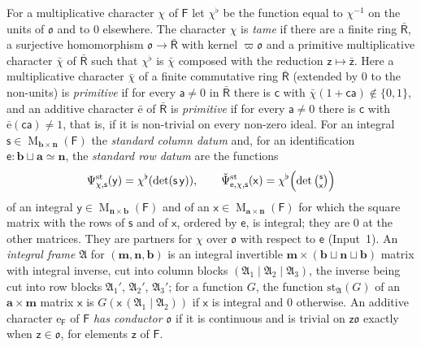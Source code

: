 \documentclass[11pt,a4paper]{article}
\newcommand{\kw}[1]{\emph{#1}}
\theoremstyle{plainx}
\theoremstyle{uprightx}
\newcommand{\dL}{\check{\Psi}}         %
\newcommand{\dS}{\Psi}                 %
\newcommand{\sF}{\mathsf{F}}
\newcommand{\sO}{\mathfrak{o}}
\newcommand{\sR}{\mathsf{R}}
\newcommand{\ba}{\mathbf{a}}
\newcommand{\bb}{\mathbf{b}}
\newcommand{\bm}{\mathbf{m}}
\newcommand{\bn}{\mathbf{n}}
\newcommand{\se}{\mathsf{e}}
\newcommand{\sx}{\mathsf{x}}
\newcommand{\sy}{\mathsf{y}}
\newcommand{\sz}{\mathsf{z}}
\newcommand{\ssx}{\mathsf{s}}
\newcommand{\fA}{\mathfrak{A}}
\newcommand{\Mat}[2]{\operatorname{M}_{#1\times#2}}
\newcommand{\stc}[2]{\dS^{\mathrm{st}}_{#1,#2}}
\newcommand{\str}[3]{\dL^{\mathrm{st}}_{#1,#2,#3}}
\newcommand{\inu}[1]{#1^{\flat}}
\begin{document}
For a multiplicative character $\chi$ of $\sF$ let $\inu{\chi}$ be the function equal to $\chi^{-1}$ on the units
of $\sO$ and to $0$ elsewhere. The character $\chi$ is \kw{tame} if there are a finite ring $\bar{\sR}$, a
surjective homomorphism $\sO\to\bar{\sR}$ with kernel $\varpi\sO$ and a primitive multiplicative character $\bar\chi$
of $\bar{\sR}$ such that $\inu{\chi}$ is $\bar\chi$ composed with the reduction $\sz\mapsto\bar{\sz}$. Here a
multiplicative character $\bar\chi$ of a finite commutative ring $\bar{\sR}$ (extended by $0$ to the non-units) is
\kw{primitive} if for every $\mathsf{a}\ne0$ in $\bar{\sR}$ there is $\mathsf{c}$ with
$\bar\chi(1+\mathsf{c}\mathsf{a})\notin\{0,1\}$, and an additive character $\bar{\mathrm{e}}$ of $\bar{\sR}$ is
\kw{primitive} if for every $\mathsf{a}\ne0$ there is $\mathsf{c}$ with $\bar{\mathrm{e}}(\mathsf{c}\mathsf{a})\ne1$,
that is, if it is non-trivial on every non-zero ideal. For an integral
$\ssx\in\Mat{\bb}{\bn}(\sF)$ the \kw{standard column datum} and, for an identification
$\se\colon\bb\sqcup\ba\simeq\bn$, the \kw{standard row datum} are the functions
\[\stc{\chi}{\ssx}(\sy)=\inu{\chi}(\det(\ssx\,\sy)),\qquad
\str{\se}{\chi}{\ssx}(\sx)=\inu{\chi}\Bigl(\det\tbinom{\ssx}{\sx}\Bigr)\]
of an integral $\sy\in\Mat{\bn}{\bb}(\sF)$ and of an $\sx\in\Mat{\ba}{\bn}(\sF)$ for which the square matrix with
the rows of $\ssx$ and of $\sx$, ordered by $\se$, is integral; they are $0$ at the other matrices. They are
partners for $\chi$ over $\sO$ with respect to $\se$ (Input~1). An \kw{integral frame} $\fA$ for
$(\bm,\bn,\bb)$ is an integral invertible $\bm\times(\bb\sqcup\bn\sqcup\bb)$ matrix with integral inverse, cut into
column blocks $(\fA_1\mid\fA_2\mid\fA_3)$, the inverse being cut into row blocks $\fA_1'$, $\fA_2'$, $\fA_3'$; for a function $G$, the
function $\mathrm{st}_{\fA}(G)$ of an $\ba\times\bm$ matrix $\sx$ is $G(\sx\,(\fA_1\mid\fA_2))$ if $\sx$ is integral and
$0$ otherwise. An additive character $\mathrm{e}_{\sF}$ of $\sF$ \kw{has conductor $\sO$} if it is continuous and
is trivial on $\sz\sO$ exactly when $\sz\in\sO$, for elements $\sz$ of $\sF$.
\end{document}
